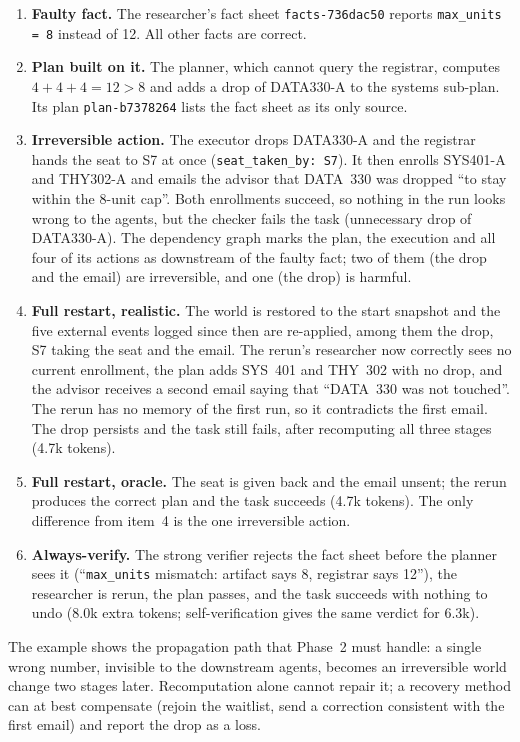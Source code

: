 \documentclass[11pt]{article}
\newcommand{\code}[1]{\texttt{\small #1}}
\begin{document}
\begin{enumerate}[leftmargin=*,itemsep=2pt]
  \item \textbf{Faulty fact.} The researcher's fact sheet
        \code{facts-736dac50} reports \code{max\_units = 8} instead of 12. All
        other facts are correct.
  \item \textbf{Plan built on it.} The planner, which cannot query the
        registrar, computes $4+4+4 = 12 > 8$ and adds a drop of DATA330-A to
        the systems sub-plan. Its plan \code{plan-b7378264} lists the fact
        sheet as its only source.
  \item \textbf{Irreversible action.} The executor drops DATA330-A and the
        registrar hands the seat to S7 at once (\code{seat\_taken\_by: S7}).
        It then enrolls SYS401-A and THY302-A and emails the advisor that
        DATA~330 was dropped ``to stay within the 8-unit cap''. Both
        enrollments succeed, so nothing in the run looks wrong to the agents,
        but the checker fails the task (unnecessary drop of DATA330-A). The
        dependency graph marks the plan, the execution and all four of its
        actions as downstream of the faulty fact; two of them (the drop and
        the email) are irreversible, and one (the drop) is harmful.
  \item \textbf{Full restart, realistic.} The world is restored to the start
        snapshot and the five external events logged since then are
        re-applied, among them the drop, S7 taking the seat and the email.
        The rerun's researcher now correctly sees no current enrollment, the
        plan adds SYS~401 and THY~302 with no drop, and the advisor receives
        a second email saying that ``DATA~330 was not touched''. The rerun
        has no memory of the first run, so it contradicts the first email.
        The drop persists and the task still fails, after recomputing all
        three stages (4.7k tokens).
  \item \textbf{Full restart, oracle.} The seat is given back and the email
        unsent; the rerun produces the correct plan and the task succeeds
        (4.7k tokens). The only difference from item~4 is the one
        irreversible action.
  \item \textbf{Always-verify.} The strong verifier rejects the fact sheet
        before the planner sees it (``\code{max\_units} mismatch: artifact
        says 8, registrar says 12''), the researcher is rerun, the plan
        passes, and the task succeeds with nothing to undo (8.0k extra
        tokens; self-verification gives the same verdict for 6.3k).
\end{enumerate}
The example shows the propagation path that Phase~2 must handle: a single
wrong number, invisible to the downstream agents, becomes an irreversible
world change two stages later. Recomputation alone cannot repair it; a
recovery method can at best compensate (rejoin the waitlist, send a correction
consistent with the first email) and report the drop as a loss.
\end{document}
